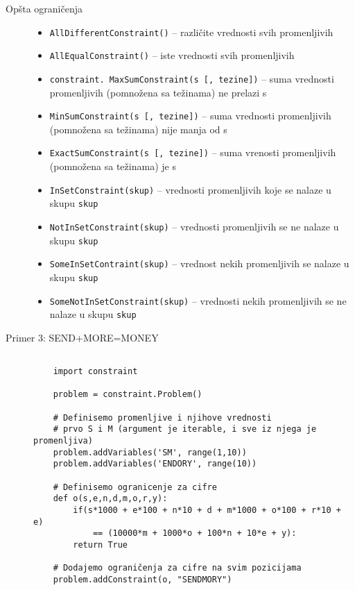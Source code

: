 \documentclass[../main.tex]{subfiles}
\begin{document}
\begin{description}
	\item[Opšta ograničenja] \hfill
	
	\begin{itemize}
		\item \texttt{AllDifferentConstraint()} -- različite vrednosti svih promenljivih
		\item \texttt{AllEqualConstraint()} -- iste vrednosti svih promenljivih
		\item \texttt{constraint. MaxSumConstraint(s [, tezine])} -- suma vrednosti promenljivih (pomnožena sa težinama) ne prelazi s
		\item \texttt{MinSumConstraint(s [, tezine])} -- suma vrednosti promenljivih (pomnožena sa težinama) nije manja od s
		\item \texttt{ExactSumConstraint(s [, tezine])} -- suma vrenosti promenljivih (pomnožena sa težinama) je s
		\item \texttt{InSetConstraint(skup)} -- vrednosti promenljivih koje se nalaze u skupu \texttt{skup}
		\item \texttt{NotInSetConstraint(skup)} -- vrednosti promenljivih se ne nalaze u skupu \texttt{skup}
		\item \texttt{SomeInSetContraint(skup)} -- vrednost nekih promenljivih se nalaze u skupu \texttt{skup}
		\item \texttt{SomeNotInSetConstraint(skup)} -- vrednosti nekih promenljivih se ne nalaze u skupu \texttt{skup}
	\end{itemize}

	\item[Primer 3: SEND+MORE=MONEY] \hfill

	\begin{boxprimer}
	\begin{Verbatim}[samepage=true]

	import constraint
	
	problem = constraint.Problem()
	
	# Definisemo promenljive i njihove vrednosti
	# prvo S i M (argument je iterable, i sve iz njega je promenljiva)
	problem.addVariables('SM', range(1,10))
	problem.addVariables('ENDORY', range(10))
	
	# Definisemo ogranicenje za cifre
	def o(s,e,n,d,m,o,r,y):
		if(s*1000 + e*100 + n*10 + d + m*1000 + o*100 + r*10 + e) 
			== (10000*m + 1000*o + 100*n + 10*e + y):
		return True

	# Dodajemo ograničenja za cifre na svim pozicijama
	problem.addConstraint(o, "SENDMORY")
	

\end{Verbatim}
\end{boxprimer}
\end{description}
\end{document}
